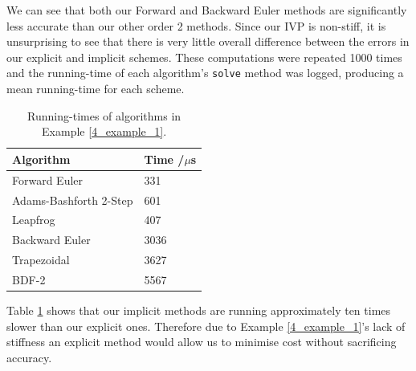 \documentclass[12pt, twoside]{report}
\theoremstyle{plain}
\theoremstyle{definition}
\theoremstyle{definition}
\begin{document}
        We can see that both our Forward and Backward Euler methods are 
        significantly less accurate than our other order 2 methods. Since our 
        IVP is non-stiff, it is unsurprising to see that there is very little
        overall difference between the errors in our explicit and implicit 
        schemes. These computations were repeated 1000 times and the 
        running-time of each algorithm's \texttt{solve} method 
        was logged, producing a mean running-time for each scheme. 
        \begin{table}
            \centering
                \begin{tabular}[H]{| l | l |}
                    \hline
                    Algorithm & Time /$\mu$s \\ \hline
                    Forward Euler & 331 \\ \hline
                    Adams-Bashforth 2-Step & 601 \\ \hline
                    Leapfrog & 407 \\ \hline
                    Backward Euler & 3036 \\ \hline
                    Trapezoidal & 3627 \\ \hline
                    BDF-2 & 5567 \\
                    \hline
                \end{tabular}
                \caption{Running-times of algorithms in Example 
                \ref{4_example_1}.}
                \label{4_1_runtimes}
        \end{table}
        Table \ref{4_1_runtimes} shows that our implicit methods are running
        approximately ten times slower than our explicit ones. Therefore due 
        to Example \ref{4_example_1}'s lack of stiffness an explicit method
        would allow us to minimise cost without sacrificing accuracy. 
        
\end{document}
